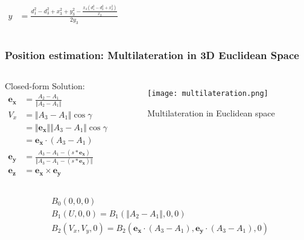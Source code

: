 \documentclass[10pt]{beamer}
\begin{document}
\begin{frame}
\begin{columns}
\begin{equation}
\begin{split}
            \end{split}
            \label{eqn:simplified_multilateration_x}
        \end{equation}
        \begin{equation}
            \begin{split}
                y &= \frac{d_1^2 - d_3^2 + x_3^2 + y_3^2 - \frac{x_3(d_1^2 - d_2^2 + x_2^2)}{x_2}}{2y_3}
            \end{split}
            \label{eqn:simplified_multilateration_z}
        \end{equation}
    \end{columns}
\end{frame}

\begin{frame}
    \frametitle{Position estimation: Multilateration in 3D Euclidean Space}
    \begin{columns}
        Closed-form Solution:
        \begin{equation}
            \begin{split}
            \boldsymbol{e_x} &= \frac{A_2-A_1}{\Vert A_2 - A_1\Vert} \\
            V_x &= \Vert A_3 - A_1 \Vert \cos{\gamma} \\
            &= \Vert \boldsymbol{e_x} \Vert \Vert A_3 - A_1 \Vert \cos{\gamma} \\
            &= \boldsymbol{e_x} \cdot (A_3 - A_1) \\
            \boldsymbol{e_y} &= \frac{A_3-A_1-(s*\boldsymbol{e_x})}{\Vert A_3-A_1-(s*\boldsymbol{e_x})\Vert} \\
            \boldsymbol{e_z} &= \boldsymbol{e_x} \times \boldsymbol{e_y}
            \end{split}
        \end{equation}

        \begin{figure}[H]
            \centering
            \texttt{[image: multilateration.png]}
            \caption{Multilateration in Euclidean space}
            \label{fig:multilateration}
        \end{figure}
    \end{columns}
    \begin{equation}
        \begin{split}
            &B_0(0,0,0) \\
            &B_1(U, 0, 0) = B_1(\Vert A_2 - A_1 \Vert, 0, 0) \\
            &B_2(V_x, V_y, 0) = B_2(\boldsymbol{e_x} \cdot (A_3 - A_1), \boldsymbol{e_y} \cdot (A_3 - A_1), 0) 
        \end{split}
        \label{eqn:multilateration_to_simplified_problem}
    \end{equation}
\end{frame}
\end{document}
